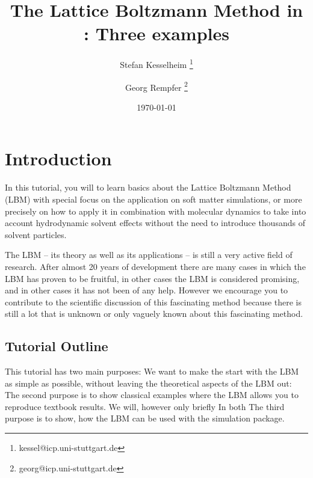 \subject{ESPResSo Tutorial}
\title{The Lattice Boltzmann Method in \ES{}: Three examples } \author{ Stefan Kesselheim \thanks{\ttfamily 
kessel@icp.uni-stuttgart.de}  \and  Georg Rempfer \thanks{\ttfamily 
georg@icp.uni-stuttgart.de}}
\date{\today}
\publishers{Institute for Computational Physics, Stuttgart University}

\maketitle \tableofcontents


\chapter{Introduction}
In this tutorial, you will to learn basics about the 
Lattice Boltzmann Method (LBM) with special focus on the application
on soft matter simulations, or more precisely on how to apply it 
in combination with molecular dynamics to take into account 
hydrodynamic solvent effects without the need to introduce
thousands of solvent particles. 

The LBM -- its theory as well as its applications -- is 
still a very active field of research. After almost 20 years
of development there are many cases in which the LBM has proven
to be fruitful, in other cases the LBM is considered promising,
and in other cases it has not been of any help. However we
encourage you to contribute to the scientific discussion 
of this fascinating method because there is still a lot 
that is unknown or only vaguely known about this fascinating
method. 

\section{Tutorial Outline}
This tutorial has two main purposes: We want to make the start
with the LBM as simple as possible, without leaving the theoretical
aspects of the LBM out:
The second purpose is to show classical examples where the LBM allows 
you to reproduce textbook results. We will, however only briefly 
In both 
The third purpose is to show, how the LBM can be used with the
\ES{} simulation package. 


